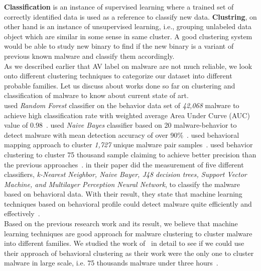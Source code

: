\textbf{Classification} is an instance of supervised learning where a trained set of correctly identified data is used as a reference to classify new data.
\textbf{Clustring}, on other hand is an instance of unsupervised learning, i.e., grouping unlabeled data object which are similar in some sense in same cluster.
A good clustering system would be able to study new binary to find if the new binary is a variant of previous known malware and classify them accordingly.\\
As we described earlier that AV label on malware are not much reliable, we look onto different clustering techniques to categorize our dataset into different probable families.
Let us discuss about works done so far on clustering and classification of malware to know about current state of art.\\
\textbf{\citeauthor{pirscoveanu}} used \emph{Random Forest} classifier on the behavior data set of \emph{42,068} malware to achieve high classification rate with weighted average Area Under Curve (AUC) value of 0.98~\cite[]{pirscoveanu}.
\textbf{\citeauthor{mosko}} used \emph{Naive Bayes} classifier based on 20 malware-behavior to detect malware with mean detection accuracy of over 90\%~\cite[]{mosko}.
\textbf{\citeauthor{yavvari}} used behavioral mapping approach to cluster \emph{1,727} unique malware pair samples~\cite[]{yavvari}.
\textbf{\citeauthor{bayer}} used behavior clustering to cluster 75 thousand sample claiming to achieve better precision than the previous approaches~\cite[]{bayer}.
\textbf{\citeauthor{firdausi}} in their paper did the measurement of five different classifiers, \emph{k-Nearest Neighbor, Naive Bayer, J48 decision trees, Support Vector Machine, and Multilayer Perception Neural Network}, to classify the malware based on behavioral data.
With their result, they state that machine learning techniques based on behavioral profile could detect malware quite efficiently and effectively~\cite[]{firdausi}.\\
Based on the previous research work and its result, we believe that machine learning techniques are good approach for malware clustering to cluster malware into different families.
We studied the work of~\citeauthor{bayer} in detail to see if we could use their approach of behavioral clustering as their work were the only one to cluster malware in large scale, i.e. 75 thousands malware under three hours~\cite[]{bayer}.
